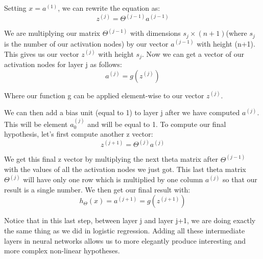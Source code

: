 \documentclass{report}
\begin{document}
Setting $x = a^{(1)}$, we can rewrite the equation as:
$$z^{(j)} = \Theta^{(j-1)}a^{(j-1)}$$

We are multiplying our matrix $\Theta^{(j-1)}$ with dimensions $s_j\times (n+1)$(where $s_j$ is the number of our activation nodes) by our vector $a^{(j-1)}$ with height (n+1). This gives us our vector $z^{(j)}$ with height $s_j$. Now we can get a vector of our activation nodes for layer j as follows: 
$$a^{(j)} = g(z^{(j)})$$

Where our function g can be applied element-wise to our vector $z^{(j)}$.

We can then add a bias unit (equal to 1) to layer j after we have computed $a^{(j)}$. This will be element $a_0^{(j)}$ and will be equal to 1. To compute our final hypothesis, let's first compute another z vector:
$$z^{(j+1)} = \Theta^{(j)}a^{(j)}$$

We get this final z vector by multiplying the next theta matrix after $\Theta^{(j-1)}$ with the values of all the activation nodes we just got. This last theta matrix $\Theta^{(j)}$ will have only one row which is multiplied by one column $a^{(j)}$ so that our result is a single number. We then get our final result with:
$$h_\Theta(x) = a^{(j+1)} = g(z^{(j+1)})$$

Notice that in this last step, between layer j and layer j+1, we are doing exactly the same thing as we did in logistic regression. Adding all these intermediate layers in neural networks allows us to more elegantly produce interesting and more complex non-linear hypotheses.
\end{document}
